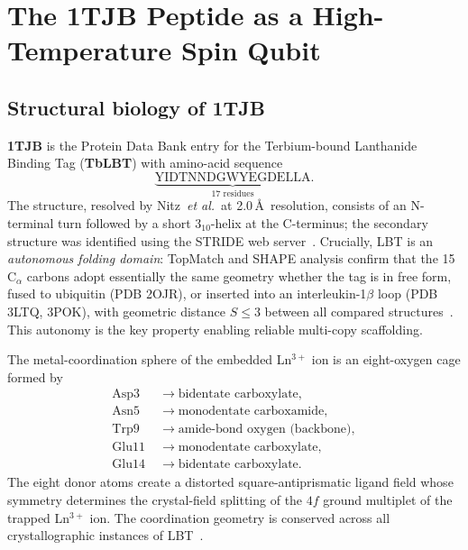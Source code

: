 \documentclass[11pt,oneside]{amsbook}
\numberwithin{equation}{section}
\theoremstyle{plain}
\theoremstyle{definition}
\theoremstyle{remark}
\begin{document}
\section{The 1TJB Peptide as a High-Temperature Spin Qubit}
\label{sec:pqpu_1tjb}

\subsection{Structural biology of 1TJB}
\label{subsec:pqpu_structure}

\textbf{1TJB} is the Protein Data Bank entry for the Terbium-bound Lanthanide
Binding Tag (\textbf{TbLBT}) with amino-acid sequence
\[
  \underbrace{\text{YIDTNNDGWYEGDELLA}}_{17 \text{ residues}}.
\]
The structure, resolved by Nitz~\emph{et al.}\ at 2.0\,\AA~resolution, consists
of an N-terminal turn followed by a short $3_{10}$-helix at the C-terminus; the
secondary structure was identified using the STRIDE web server~\cite{NitzEtAl2004}.
Crucially, LBT is an \emph{autonomous folding domain}: TopMatch and SHAPE
analysis confirm that the 15 C$_\alpha$ carbons adopt essentially the same
geometry whether the tag is in free form, fused to ubiquitin (PDB 2OJR), or
inserted into an interleukin-1$\beta$ loop (PDB 3LTQ, 3POK), with geometric
distance $S \le 3$ between all compared structures~\cite{RosalenyEtAl2017}.
This autonomy is the key property enabling reliable multi-copy scaffolding.

The metal-coordination sphere of the embedded Ln$^{3+}$ ion is an
eight-oxygen cage formed by
\begin{align*}
  \text{Asp3}  &\;\to \text{bidentate carboxylate},  \\
  \text{Asn5}  &\;\to \text{monodentate carboxamide},\\
  \text{Trp9}  &\;\to \text{amide-bond oxygen (backbone)}, \\
  \text{Glu11} &\;\to \text{monodentate carboxylate}, \\
  \text{Glu14} &\;\to \text{bidentate carboxylate}.
\end{align*}
The eight donor atoms create a distorted square-antiprismatic ligand field whose
symmetry determines the crystal-field splitting of the $4f$ ground multiplet of
the trapped Ln$^{3+}$ ion.  The coordination geometry is conserved across all
crystallographic instances of LBT~\cite{RosalenyEtAl2017}.
\end{document}
